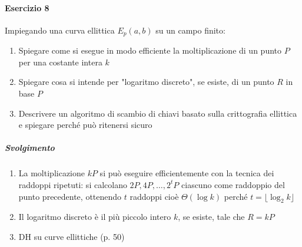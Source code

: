 \documentclass[10pt]{book}
\begin{document}
\paragraph{Esercizio 8} Impiegando una curva ellittica $E_p(a,b)$ su un campo finito:
\begin{enumerate}
	\item Spiegare come si esegue in modo efficiente la moltiplicazione di un punto $P$ per una costante intera $k$
	\item Spiegare cosa si intende per "logaritmo discreto", se esiste, di un punto $R$ in base $P$
	\item Descrivere un algoritmo di scambio di chiavi basato sulla crittografia ellittica e spiegare perché può ritenersi sicuro
\end{enumerate}
\subparagraph{Svolgimento} \begin{enumerate}
	\item La moltiplicazione $kP$ si può eseguire efficientemente con la tecnica dei raddoppi ripetuti: si calcolano $2P, 4P,\ldots,2^tP$ ciascuno come raddoppio del punto precedente, ottenendo $t$ raddoppi cioè $\Theta(\log k)$ perché $t = \lfloor \log_2 k\rfloor$
	\item Il logaritmo discreto è il più piccolo intero $k$, se esiste, tale che $R = kP$
	\item DH su curve ellittiche (p. 50)
\end{enumerate}
\pagebreak
\end{document}
